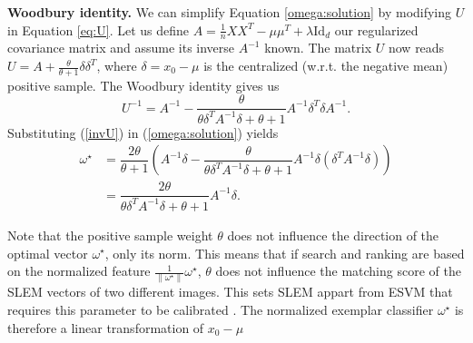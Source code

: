 \textbf{Woodbury identity.} 
We can simplify Equation \ref{omega:solution} by modifying $U$ in Equation \ref{eq:U}.
Let us define $A = \frac{1}{n}XX^T-\mu\mu^T +\lambda\mathrm{Id}_d$ our regularized covariance matrix and assume its inverse $A^{-1}$ known. 
The matrix $U$ now reads $U = A + \frac{\theta}{\theta+1}\delta\delta^T$, where $\delta=x_0-\mu$ is the centralized (w.r.t. the negative mean) positive sample. The Woodbury identity \cite{woodbury} gives us
\begin{equation}
U^{-1} = A^{-1} -\dfrac{\theta}{\theta\delta^TA^{-1}\delta+ \theta+1}A^{-1}\delta^T\delta A^{-1}. \label{invU}
\end{equation}
Substituting (\ref{invU}) in (\ref{omega:solution}) yields
\begin{equation}
\begin{split}
\omega^\star &= \dfrac{2\theta}{\theta +1}\left(A^{-1}\delta - \dfrac{\theta}{\theta\delta^TA^{-1}\delta+ \theta+1} A^{-1}\delta (\delta^TA^{-1}\delta)\right)\\
&= \dfrac{2\theta}{\theta\delta^TA^{-1}\delta+ \theta+1} A^{-1}\delta.\label{Wood:omega}
\end{split}
\end{equation}

Note that the positive sample weight $\theta$ does not influence the direction of the optimal vector $\omega^\star$, only its norm. This means that if search and ranking are based on the normalized feature $\frac{1}{\|\omega^\star\|}\omega^\star$, $\theta$ does not influence the matching score of the SLEM vectors of two different images. This sets SLEM appart from ESVM that requires this parameter to be calibrated \cite{Efros11,ZePe15}. The normalized exemplar classifier $\omega^\star$ is therefore a linear transformation of $x_0-\mu$

